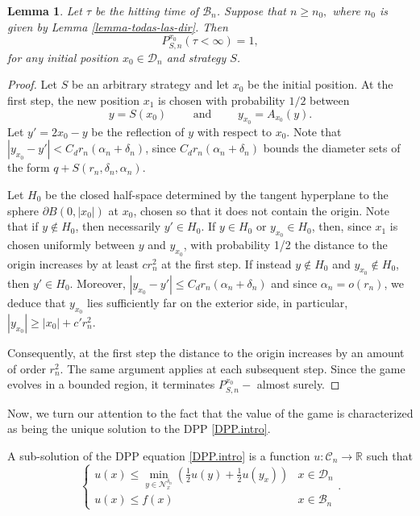 \documentclass[11pt]{amsart}
\newtheorem{lemma}{Lemma}
\theoremstyle{definition}
\theoremstyle{remark}
\numberwithin{equation}{section}
\newcommand{\R}{{\mathbb R}}
\newcommand{\Domain}{\mathcal{D}}
\newcommand{\B}{\mathcal{B}}
\newcommand{\C}{{\mathcal C}}
\newcommand{\Nc}{{\mathcal N}}
\begin{document}
\begin{lemma}
\label{lema-juego-termina}
Let $\tau$ be the hitting time of $\B_n$.
Suppose that $n\geq n_0,$ where $n_0$ is given by Lemma \ref{lemma-todas-las-dir}.
Then $$P_{S,n}^{x_0}(\tau < \infty)=1,$$ for any initial position $x_0\in\Domain_n$ and strategy $S$.
\end{lemma}

\begin{proof}
Let $S$ be an arbitrary strategy and let $x_0$ be the initial position. 
At the first step, the new position $x_1$ is chosen with probability $1/2$ between
\[
y = S(x_0) \qquad \text{ and } \qquad y_{x_0} = A_{x_0}(y)
.
\]
Let $y'=2x_0 - y$ be the reflection of $y$ with respect to $x_0$.
Note that $|y_{x_0}-y'|< C_d r_n(\alpha_n +\delta_n)$, since $C_d r_n(\alpha_n+\delta_n)$ bounds the diameter sets of the form $q+S(r_n,\delta_n,\alpha_n)$.

Let $H_0$ be the closed half-space determined by the tangent hyperplane to the sphere $\partial B(0,|x_0|)$ at $x_0$, chosen so that it does not contain the origin. 
Note that if $y\notin H_0$, then necessarily $y'\in H_0$. 
If $y\in H_0$ or $y_{x_0}\in H_0$, then, since $x_1$ is chosen uniformly between $y$ and $y_{x_0}$, with probability 1/2 the distance to the origin increases by at least $c r_n^2$ at the first step.
If instead $y\notin H_0$ and $y_{x_0}\notin H_0$, then $y'\in H_0$. 
Moreover, $|y_{x_0}-y'|\leq C_d r_n(\alpha_n+\delta_n)$ and since $\alpha_n=o(r_n)$, we deduce that $y_{x_0}$ lies sufficiently far on the exterior side, in particular, $|y_{x_0}|\geq |x_0|+c'r_n^2$.

Consequently, at the first step the distance to the origin increases by an amount of order $r_n^2$. The same argument applies at each subsequent step. Since the game evolves in a bounded region, it terminates $P_{S,n}^{x_0}-$ almost surely.
\end{proof}

Now, we turn our attention to the fact that the value of the game is characterized as being the unique
solution to the DPP \eqref{DPP.intro}.

A sub-solution of the DPP equation \eqref{DPP.intro} is a function $u\colon \C_n \to \R$ such that
\begin{equation} 
\begin{cases}
\displaystyle u(x)\le\min\limits_{y\in \Nc_x^{\delta_n}} 
\left(
\frac{1}{2} 
u(y) 
+
\frac{1}{2}
u(y_x) 
\right)
& x\in \Domain_n \\
u(x)\le f(x)
& x\in \B_n
\end{cases} 
.
\end{equation}
\end{document}
